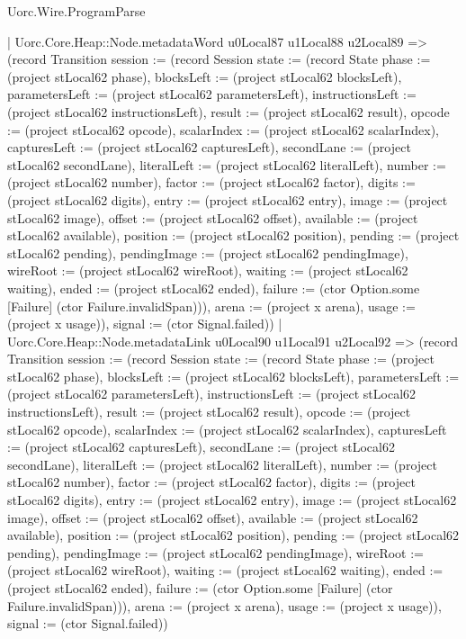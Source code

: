 \begin{lexlean}{Uorc.Wire.ProgramParse}
\begin{semanticmodule}
{        | Uorc.Core.Heap::Node.metadataWord u0Local87 u1Local88 u2Local89 => (record Transition {session := (record Session {state := (record State {phase := (project stLocal62 phase), blocksLeft := (project stLocal62 blocksLeft), parametersLeft := (project stLocal62 parametersLeft), instructionsLeft := (project stLocal62 instructionsLeft), result := (project stLocal62 result), opcode := (project stLocal62 opcode), scalarIndex := (project stLocal62 scalarIndex), capturesLeft := (project stLocal62 capturesLeft), secondLane := (project stLocal62 secondLane), literalLeft := (project stLocal62 literalLeft), number := (project stLocal62 number), factor := (project stLocal62 factor), digits := (project stLocal62 digits), entry := (project stLocal62 entry), image := (project stLocal62 image), offset := (project stLocal62 offset), available := (project stLocal62 available), position := (project stLocal62 position), pending := (project stLocal62 pending), pendingImage := (project stLocal62 pendingImage), wireRoot := (project stLocal62 wireRoot), waiting := (project stLocal62 waiting), ended := (project stLocal62 ended), failure := (ctor Option.some [Failure] (ctor Failure.invalidSpan))}), arena := (project x arena), usage := (project x usage)}), signal := (ctor Signal.failed)})
        | Uorc.Core.Heap::Node.metadataLink u0Local90 u1Local91 u2Local92 => (record Transition {session := (record Session {state := (record State {phase := (project stLocal62 phase), blocksLeft := (project stLocal62 blocksLeft), parametersLeft := (project stLocal62 parametersLeft), instructionsLeft := (project stLocal62 instructionsLeft), result := (project stLocal62 result), opcode := (project stLocal62 opcode), scalarIndex := (project stLocal62 scalarIndex), capturesLeft := (project stLocal62 capturesLeft), secondLane := (project stLocal62 secondLane), literalLeft := (project stLocal62 literalLeft), number := (project stLocal62 number), factor := (project stLocal62 factor), digits := (project stLocal62 digits), entry := (project stLocal62 entry), image := (project stLocal62 image), offset := (project stLocal62 offset), available := (project stLocal62 available), position := (project stLocal62 position), pending := (project stLocal62 pending), pendingImage := (project stLocal62 pendingImage), wireRoot := (project stLocal62 wireRoot), waiting := (project stLocal62 waiting), ended := (project stLocal62 ended), failure := (ctor Option.some [Failure] (ctor Failure.invalidSpan))}), arena := (project x arena), usage := (project x usage)}), signal := (ctor Signal.failed)})
}
\end{semanticmodule}
\end{lexlean}
